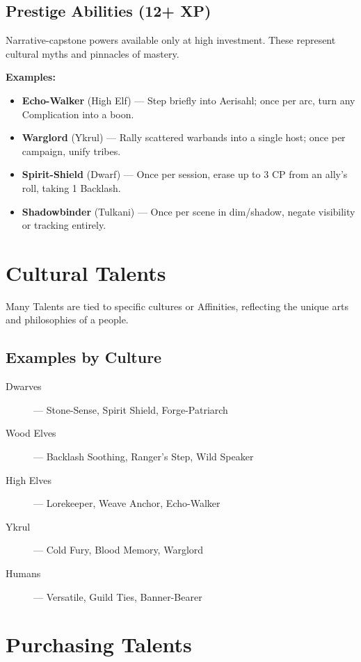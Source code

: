 \subsection*{Prestige Abilities (12+ XP)}

Narrative-capstone powers available only at high investment. These represent cultural myths and pinnacles of mastery.

\textbf{Examples:}
\begin{itemize}
  \item \textbf{Echo-Walker} (High Elf) — Step briefly into Aerisahl; once per arc, turn any Complication into a boon.
  \item \textbf{Warglord} (Ykrul) — Rally scattered warbands into a single host; once per campaign, unify tribes.
  \item \textbf{Spirit-Shield} (Dwarf) — Once per session, erase up to 3 CP from an ally’s roll, taking 1 Backlash.
  \item \textbf{Shadowbinder} (Tulkani) — Once per scene in dim/shadow, negate visibility or tracking entirely.
\end{itemize}

\section{Cultural Talents}

Many Talents are tied to specific cultures or Affinities, reflecting the unique arts and philosophies of a people.

\subsection*{Examples by Culture}

\begin{description}
  \item[Dwarves] — Stone-Sense, Spirit Shield, Forge-Patriarch
  \item[Wood Elves] — Backlash Soothing, Ranger’s Step, Wild Speaker
  \item[High Elves] — Lorekeeper, Weave Anchor, Echo-Walker
  \item[Ykrul] — Cold Fury, Blood Memory, Warglord
  \item[Humans] — Versatile, Guild Ties, Banner-Bearer
\end{description}

\section{Purchasing Talents}


